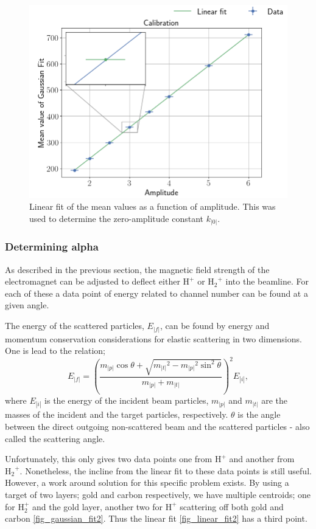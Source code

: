 \begin{figure}[t]
\centering
\includegraphics[width=0.99\columnwidth]{k0_plotting}
\caption{Linear fit of the mean values as a function of amplitude. This was
used to determine the zero-amplitude constant $k_|0|$.}
\label{fig_linear_fit}
\end{figure}

 
\subsubsection{Determining alpha}
As described in the previous section, the magnetic field strength of the
electromagnet can be adjusted to deflect either $\mathrm{H^+}$ or
$\mathrm{{H_2}^+}$ into the beamline. For each of these a data point of energy
related to channel number can be found at a given angle.

The energy of the scattered particles, $E_|f|$, can be found by energy and
momentum conservation considerations for elastic scattering in two dimensions.
One is lead to the relation;
\begin{equation}
E_|f| = \left( \frac{m_|p| \cos\theta + \sqrt{{m_|t|}^2 - {m_|p|}^2
\sin^2\theta}}{m_|p|+m_|t|} \right)^2 E_|i|,
\label{eq_5}
\end{equation}
where $E_|i|$ is the energy of the incident beam particles, $m_|p|$ and $m_|t|$ are
the masses of the incident and the target particles, respectively. 
$\theta$ is the angle between the direct outgoing non-scattered beam and the
scattered particles - also called the scattering angle.

Unfortunately, this only gives two data points one from $\mathrm{H^+}$ and
another from $\mathrm{{H_2}^+}$. Nonetheless, the incline from the linear fit
to these data points is still useful. However, a work around solution
for this specific problem exists. By using a target of two layers; gold and carbon
respectively, we have multiple centroids; one for $\mathrm{H_2^+}$ and the gold
layer, another two for $\mathrm{H^+}$
scattering off both gold and carbon \cref{fig_gaussian_fit2}. Thus the linear fit
\cref{fig_linear_fit2} has a third point.


